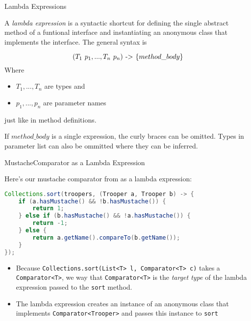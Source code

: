 \documentclass{beamer}
\begin{document}
\begin{frame}[fragile]{Lambda Expressions}

A {\it lambda expression} is a syntactic shortcut for defining the single abstract method of a funtional interface and instantiating an anonymous class that implements the interface.  The general syntax is

\[
(T_1 \hspace{.05in} p_1, ..., T_n \hspace{.05in} p_n) \hspace{.05in} \text{->} \hspace{.05in} \{ method\_body \}
\]
Where
\begin{itemize}
\item $T_1, ..., T_n$ are types and
\item $p_1, ..., p_n$ are parameter names
\end{itemize}
just like in method definitions.\\

\vspace{.05in}

If $method\_body$ is a single expression, the curly braces can be omitted.  Types in parameter list can also be ommitted where they can be inferred.


\end{frame}

\begin{frame}[fragile]{MustacheComparator as a Lambda Expression}

Here's our mustache comparator from   as a lambda expression:

\begin{lstlisting}[language=Java]
Collections.sort(troopers, (Trooper a, Trooper b) -> {
    if (a.hasMustache() && !b.hasMustache()) {
        return 1;
    } else if (b.hasMustache() && !a.hasMustache()) {
        return -1;
    } else {
        return a.getName().compareTo(b.getName());
    }
});
\end{lstlisting}

\begin{itemize}
\item Because {\tt Collections.sort(List<T> l, Comparator<T> c)} takes a {\tt Comparator<T>}, we way that {\tt Comparator<T>} is the {\it target type} of the lambda expression passed to the {\tt sort} method.
\item The lambda expression creates an instance of an anonymous class that implements {\tt Comparator<Trooper>} and passes this instance to {\tt sort}
\end{itemize}

\end{frame}
\end{document}
